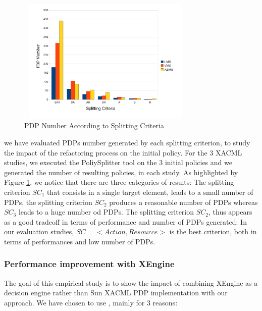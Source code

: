 \begin{figure}[!h]
  \centering
\includegraphics[width=8.5cm, height=6cm]{pdpnumber.pdf}
\begin{center}
\caption{PDP Number According to Splitting Criteria}
\label{pdpnumber}
\end{center}
\end{figure} 

we have evaluated PDPs number generated by each splitting criterion, to study the impact of the refactoring process on the initial policy. 
For the 3 XACML studies, we executed the PoliySplitter tool on the 3 initial policies and we generated the number of resulting policies, in each study. 
As highlighted by Figure \ref{pdpnumber}, we notice that there are three
 categories of results: The splitting criterion $SC_{1}$ that consists in a single target element, 
leads to a small number of PDPs, the splitting criterion $SC_{2}$ produces a reasonable number of PDPs whereas $SC_{3}$ leads to a huge 
number od PDPs. The splitting criterion $SC_{2}$, thus appears as a good tradeoff in terms of performance and number of 
PDPs generated: In our evaluation studies, $SC=<Action, Resource>$ is the best criterion, both in terms of performances and low number of PDPs.

\subsubsection{Performance improvement with XEngine}
The goal of this empirical study is to show the impact of combining XEngine as a decision engine rather than Sun XACML PDP implementation with our approach. 
We have chosen to use \cite{Xengine}, mainly for 3 reasons:

